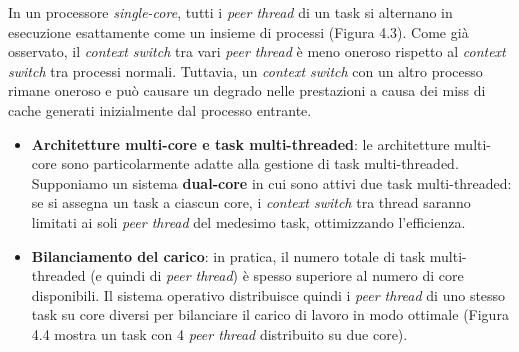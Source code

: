 In un processore \textit{single-core}, tutti i \textit{peer thread} di un task si alternano in esecuzione esattamente come un insieme di processi (Figura 4.3). Come già osservato, il \textit{context switch} tra vari \textit{peer thread} è meno oneroso rispetto al \textit{context switch} tra processi normali. Tuttavia, un \textit{context switch} con un altro processo rimane oneroso e può causare un degrado nelle prestazioni a causa dei miss di cache generati inizialmente dal processo entrante.

\begin{itemize}
    \item \textbf{Architetture multi-core e task multi-threaded}: le architetture multi-core sono particolarmente adatte alla gestione di task multi-threaded. Supponiamo un sistema \textbf{dual-core} in cui sono attivi due task multi-threaded: se si assegna un task a ciascun core, i \textit{context switch} tra thread saranno limitati ai soli \textit{peer thread} del medesimo task, ottimizzando l’efficienza.
    \item \textbf{Bilanciamento del carico}: in pratica, il numero totale di task multi-threaded (e quindi di \textit{peer thread}) è spesso superiore al numero di core disponibili. Il sistema operativo distribuisce quindi i \textit{peer thread} di uno stesso task su core diversi per bilanciare il carico di lavoro in modo ottimale (Figura 4.4 mostra un task con 4 \textit{peer thread} distribuito su due core).
\end{itemize}

